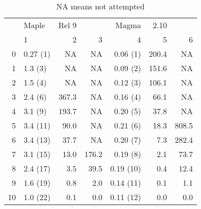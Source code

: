 \documentclass[10pt]{article}
\begin{document}
\begin{table}[htb]
\begin{center}
\begin{tabular}{r | l r r | r r r |}
   & Maple & Rel 9 &     & Magma & 2.10  & \\
 &  1       &   2         &  3     &    4       &   5   &   6   \\ \hline
 0  & 0.27 (1) &   NA        & NA     &  0.06 (1)  & 200.4 &    NA \\
 1  & 1.3  (3) &   NA        & NA     &  0.09 (2)  & 151.6 &    NA \\
 2  & 1.5  (4) &   NA        & NA     &  0.12 (3)  & 106.1 &    NA \\
 3  & 2.4  (6) & 367.3       & NA     &  0.16 (4)  &  66.1 &    NA \\
 4  & 3.1  (9) & 193.7       & NA     &  0.20 (5)  &  37.8 &    NA \\
 5  & 3.4 (11) &  90.0       & NA     &  0.21 (6)  &  18.3 & 808.5 \\
 6  & 3.4 (13) &  37.7       & NA     &  0.20 (7)  &   7.3 & 282.4 \\
 7  & 3.1 (15) &  13.0       & 176.2  &  0.19 (8)  &   2.1 &  73.7 \\
 8  & 2.4 (17) &   3.5       &  39.5  &  0.19 (10) &   0.4 &  12.4 \\
 9  & 1.6 (19) &   0.8       &   2.0  &  0.14 (11) &   0.1 &   1.1 \\
10  & 1.0 (22) &   0.1       &   0.0  &  0.11 (12) &   0.0 &   0.0 \\ \hline
\end{tabular}
\caption{NA means not attempted}
\end{center}
\end{table}
\end{document}
